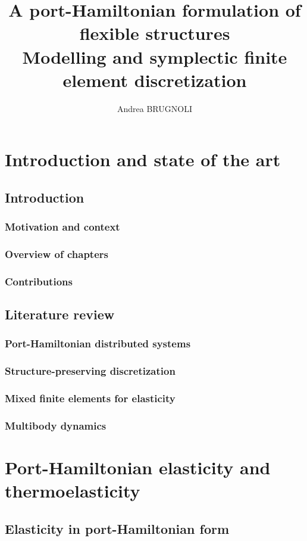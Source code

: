 \documentclass[a4paper,11pt]{book}
\title{A port-Hamiltonian formulation of flexible structures \\ \vspace{3pt}
	\Large  Modelling and symplectic finite element discretization}
\author{Andrea BRUGNOLI}
\begin{document}
	
\maketitle
	
\tableofcontents

\part{Introduction and state of the art}
\chapter{Introduction}
\section{Motivation and context}
\section{Overview of chapters}
\section{Contributions}

\chapter{Literature review}
\section{Port-Hamiltonian distributed systems}
\section{Structure-preserving discretization}
\section{Mixed finite elements for elasticity}
\section{Multibody dynamics}

\part{Port-Hamiltonian elasticity and thermoelasticity}
\chapter{Elasticity in port-Hamiltonian form}
\end{document}
